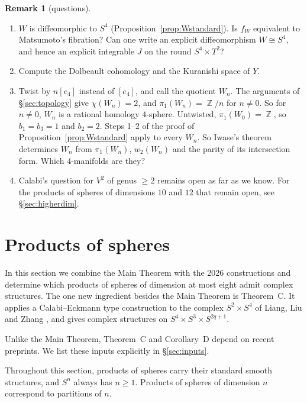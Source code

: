 \documentclass{article}
\DeclareMathOperator{\Z}{\mathbb{Z}}
\theoremstyle{definition}
\newtheorem{remark}[theorem]{Remark}
\theoremstyle{plain}
\begin{document}
\begin{remark}[questions]
\begin{enumerate}
\item $W$ is diffeomorphic to $S^4$ (Proposition~\ref{prop:Wstandard}). Is $f_W$
  equivalent to Matsumoto's fibration? Can one write an explicit diffeomorphism
  $W\cong S^4$, and hence an explicit integrable $J$ on the round $S^4\times T^2$?
\item Compute the Dolbeault cohomology and the Kuranishi space of $Y$.
\item Twist by $n[e_4]$ instead of $[e_4]$, and call the quotient $W_n$. The arguments
  of \S\ref{sec:topology} give $\chi(W_n)=2$, and $\pi_1(W_n)=\Z/n$ for $n\ne0$. So for
  $n\ne0$, $W_n$ is a rational homology $4$-sphere. Untwisted, $\pi_1(W_0)=\Z$, so
  $b_1=b_3=1$ and $b_2=2$. Steps 1--2 of the proof of
  Proposition~\ref{prop:Wstandard} apply to every $W_n$. So Iwase's theorem
  determines $W_n$ from $\pi_1(W_n)$, $w_2(W_n)$ and the parity of its intersection
  form. Which $4$-manifolds are they?
\item Calabi's question for $V^2$ of genus $\ge2$ remains open as far as we know. For
  the products of spheres of dimensions $10$ and $12$ that remain open, see
  \S\ref{sec:higherdim}.
\end{enumerate}
\end{remark}

\section{Products of spheres}\label{sec:spheres}

In this section we combine the Main Theorem with the 2026 constructions and determine
which products of spheres of dimension at most eight admit complex structures. The one
new ingredient besides the Main Theorem is Theorem~C. It applies a Calabi--Eckmann type
construction to the complex $S^2\times S^4$ of Liang, Liu and Zhang \cite{LLZ26}, and
gives complex structures on $S^4\times S^3\times S^{2q+1}$.

Unlike the Main Theorem, Theorem~C and Corollary~D depend on recent preprints. We list
these inputs explicitly in \S\ref{sec:inputs}.

Throughout this section, products of spheres carry their standard smooth structures, and
$S^n$ always has $n\ge1$. Products of spheres of dimension $n$ correspond to partitions of
$n$.
\end{document}
